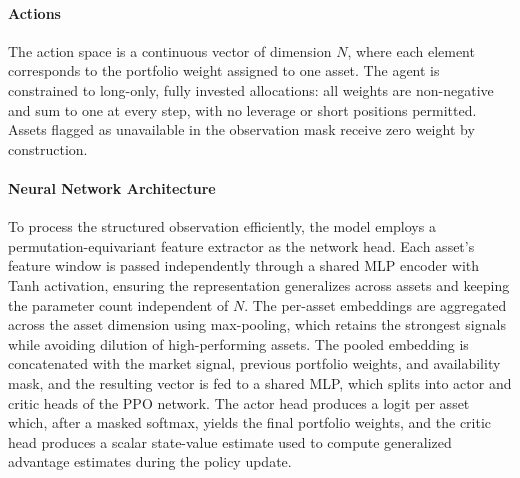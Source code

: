 \paragraph{Actions} The action space is a continuous vector of dimension $N$, where each element corresponds to the portfolio weight assigned to one asset. The agent is constrained to long-only, fully invested allocations: all weights are non-negative and sum to one at every step, with no leverage or short positions permitted. Assets flagged as unavailable in the observation mask receive zero weight by construction.

\paragraph{Neural Network Architecture} To process the structured observation efficiently, the model employs a permutation-equivariant feature extractor as the network head. Each asset's feature window is passed independently through a shared MLP encoder with Tanh activation, ensuring the representation generalizes across assets and keeping the parameter count independent of $N$. The per-asset embeddings are aggregated across the asset dimension using max-pooling, which retains the strongest signals while avoiding dilution of high-performing assets. The pooled embedding is concatenated with the market signal, previous portfolio weights, and availability mask, and the resulting vector is fed to a shared MLP, which splits into actor and critic heads of the PPO network. The actor head produces a logit per asset which, after a masked softmax, yields the final portfolio weights, and the critic head produces a scalar state-value estimate used to compute generalized advantage estimates during the policy update.

